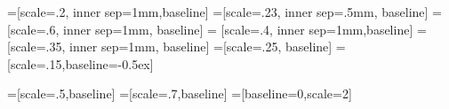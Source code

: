 \documentclass[ aspectratio=169,  12pt,blue,xcolor=pdftex,dvipsnames,table,handout,notes]{beamer}
\begin{document}
=[scale=.2, inner sep=1mm,baseline]
=[scale=.23, inner sep=.5mm, baseline]
=[scale=.6, inner sep=1mm, baseline]
= [scale=.4, inner sep=1mm,baseline] 
=[scale=.35, inner sep=1mm, baseline]
=[scale=.25, baseline]
=[scale=.15,baseline=-0.5ex]

=[scale=.5,baseline]
=[scale=.7,baseline]
=[baseline=0,scale=2]







































		\begin{frame}[plain]

			\centering
			\scalebox{4}{구조계산 그림}
	
		\end{frame}
\end{document}
